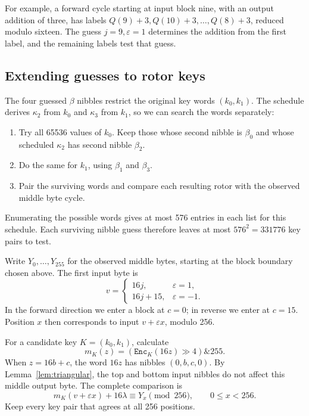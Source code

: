 \documentclass[11pt]{article}
\begin{document}
For example, a forward cycle starting at input block nine, with an
output addition of three, has labels
\(Q(9)+3,Q(10)+3,\ldots,Q(8)+3\), reduced modulo sixteen.
The guess \(j=9,\varepsilon=1\) determines the addition from the first
label, and the remaining labels test that guess.

\subsection{Extending guesses to rotor keys}
The four guessed \(\beta\) nibbles restrict the original key words
\((k_0,k_1)\). The schedule derives \(\kappa_2\) from \(k_0\) and
\(\kappa_3\) from \(k_1\), so we can search the words separately:
\begin{enumerate}
\item Try all 65536 values of \(k_0\). Keep those whose second nibble
is \(\beta_0\) and whose scheduled \(\kappa_2\) has second nibble \(\beta_2\).
\item Do the same for \(k_1\), using \(\beta_1\) and \(\beta_3\).
\item Pair the surviving words and compare each resulting rotor with
the observed middle byte cycle.
\end{enumerate}
Enumerating the possible words gives at most 576 entries in each list
for this schedule. Each surviving nibble guess therefore leaves at most
\(576^2=331776\) key pairs to test.

Write \(Y_0,\ldots,Y_{255}\) for the observed middle bytes, starting at
the block boundary chosen above. The first input byte is
\[
 v=\begin{cases}
 16j,&\varepsilon=1,\\
 16j+15,&\varepsilon=-1.
 \end{cases}
\]
In the forward direction we enter a block at \(c=0\); in reverse we
enter at \(c=15\). Position \(x\) then corresponds to input
\(v+\varepsilon x\), modulo 256.

For a candidate key \(K=(k_0,k_1)\), calculate
\[
 m_K(z)=(\mathtt{Enc}_K(16z)\gg4)\mathbin{\&}255.
\]
When \(z=16b+c\), the word \(16z\) has nibbles \((0,b,c,0)\).
By Lemma~\ref{lem:triangular}, the top and bottom input nibbles do not
affect this middle output byte. The complete comparison is
\begin{equation}
 m_K(v+\varepsilon x)+16\lambda
 \equiv Y_x\pmod {256},
 \qquad 0\le x<256.
 \label{eq:guesscheck}
\end{equation}
Keep every key pair that agrees at all 256 positions.
\end{document}
